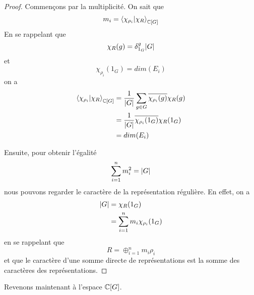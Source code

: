\ifdefined\outputproof
\begin{proof}
	Commençons par la multiplicité. On sait que
	\begin{equation}
		m_{i} = \bra{\chi_{\rho_{i}}}\ket{\chi_{R}}_{\mathbb{C}[G]}
	\end{equation}
	En se rappelant que
	\begin{equation}
		\chi_{R}(g) = \delta_{1_{G}}^{g} |G|
	\end{equation}
	et
	\begin{equation}
		\chi_{\rho_{i}}(1_{G}) = dim(E_{i})
	\end{equation}
	on a
	\begin{align}
		\bra{\chi_{\rho_{i}}}\ket{\chi_{R}}_{\mathbb{C}[G]} & =
		\frac{1}{|G|} \sum_{g \in G}
		\overline{\chi_{\rho_{i}}(g)} \chi_{R}(g) \\
		& = \frac{1}{|G|} \overline{\chi_{\rho_{i}} (1_{G})}
		\chi_{R}(1_{G}) \\
		& = dim(E_{i})
	\end{align}

	Ensuite, pour obtenir l'égalité
	\begin{equation}
		\sum_{i = 1}^{n} m_{i}^{2} = |G|
	\end{equation}
	nous pouvons regarder le caractère de la représentation régulière. En effet,
	on a
	\begin{align}
		|G| & = \chi_{R}(1_{G}) \\
		& = \sum_{i = 1}^{n} m_{i} \chi_{\rho_{i}}(1_{G})
	\end{align}
	en se rappelant que
	\begin{equation}
		R = \oplus_{i = 1}^{n} m_{i} \rho_{i}
	\end{equation}
	et que le caractère d'une somme directe de représentations est la somme des
	caractères des représentations.
\end{proof}
\fi

Revenons maintenant à l'espace $\mathbb{C}[G]$.

